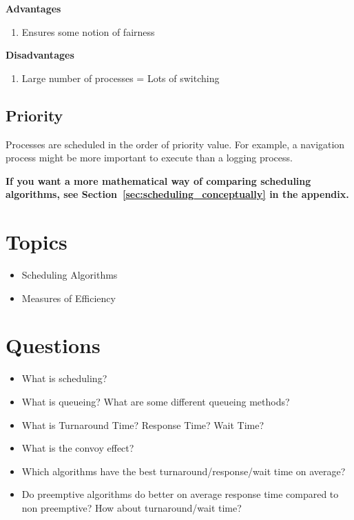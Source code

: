 \textbf{Advantages}

\begin{enumerate}
  \item Ensures some notion of fairness
\end{enumerate}

\textbf{Disadvantages}

\begin{enumerate}
  \item Large number of processes = Lots of switching
\end{enumerate}

\subsection{Priority}

Processes are scheduled in the order of priority value.
For example, a navigation process might be more important to execute than a logging process.

\textbf{If you want a more mathematical way of comparing scheduling algorithms, see Section~\ref{sec:scheduling_conceptually} in the appendix.}

\section{Topics}

\begin{itemize}
\tightlist
\item
  Scheduling Algorithms
\item
  Measures of Efficiency
\end{itemize}

\section{Questions}

\begin{itemize}
\tightlist
\item
  What is scheduling?
\item
  What is queueing? What are some different queueing methods?
\item
  What is Turnaround Time? Response Time? Wait Time?
\item
  What is the convoy effect?
\item
  Which algorithms have the best turnaround/response/wait time on average?
\item
  Do preemptive algorithms do better on average response time compared to non preemptive? How about turnaround/wait time?
\end{itemize}




